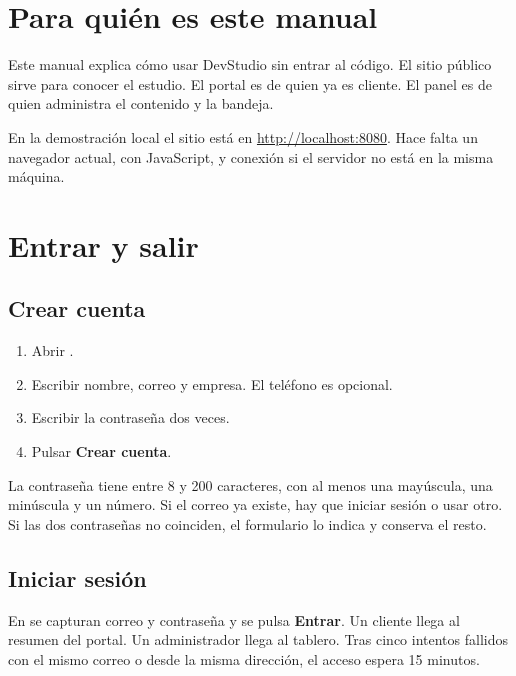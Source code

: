 



\tableofcontents
\clearpage

\section{Para quién es este manual}

Este manual explica cómo usar DevStudio sin entrar al código. El sitio público
sirve para conocer el estudio. El portal es de quien ya es cliente. El panel
es de quien administra el contenido y la bandeja.

En la demostración local el sitio está en \url{http://localhost:8080}. Hace
falta un navegador actual, con JavaScript, y conexión si el servidor no está
en la misma máquina.

\section{Entrar y salir}

\subsection{Crear cuenta}

\begin{enumerate}
  \item Abrir .
  \item Escribir nombre, correo y empresa. El teléfono es opcional.
  \item Escribir la contraseña dos veces.
  \item Pulsar \textbf{Crear cuenta}.
\end{enumerate}

La contraseña tiene entre 8 y 200 caracteres, con al menos una mayúscula, una
minúscula y un número. Si el correo ya existe, hay que iniciar sesión o usar
otro. Si las dos contraseñas no coinciden, el formulario lo indica y conserva
el resto.

\subsection{Iniciar sesión}

En  se capturan correo y contraseña y se pulsa
\textbf{Entrar}. Un cliente llega al resumen del portal. Un administrador
llega al tablero. Tras cinco intentos fallidos con el mismo correo o desde la
misma dirección, el acceso espera 15 minutos.

